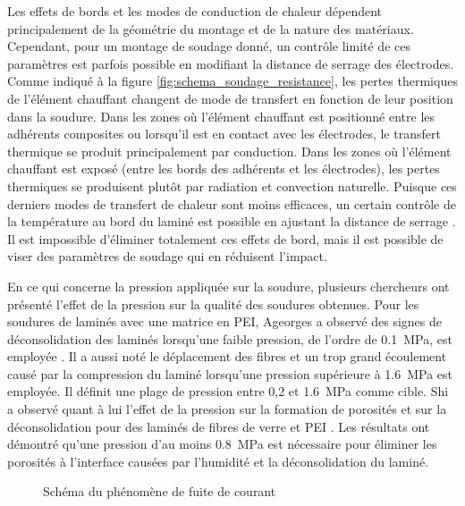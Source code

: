 Les effets de bords et les modes de conduction de chaleur dépendent principalement de la géométrie du montage et de la nature des matériaux. 
Cependant, pour un montage de soudage donné, un contrôle limité de ces paramètres est parfois possible en modifiant la distance de serrage des électrodes. 
Comme indiqué à la figure \ref{fig:schema_soudage_resistance}, les pertes thermiques de l'élément chauffant changent de mode de transfert en fonction de leur position dans la soudure. 
Dans les zones où l'élément chauffant est positionné entre les adhérents composites ou lorsqu'il est en contact avec les électrodes, le transfert thermique se produit principalement par conduction. 
Dans les zones où l'élément chauffant est exposé (entre les bords des adhérents et les électrodes), les pertes thermiques se produisent plutôt par radiation et convection naturelle. 
Puisque ces derniers modes de transfert de chaleur sont moins efficaces, un certain contrôle de la température au bord du laminé est possible en ajustant la distance de serrage \cite{Talbot2013}. 
Il est impossible d'éliminer totalement ces effets de bord, mais il est possible de viser des paramètres de soudage qui en réduisent l'impact. 

En ce qui concerne la pression appliquée sur la soudure, plusieurs chercheurs ont présenté l'effet de la pression sur la qualité des soudures obtenues. 
Pour les soudures de laminés avec une matrice en PEI, Ageorges a observé des signes de déconsolidation des laminés lorsqu'une faible pression, de l'ordre de \SI[locale=FR]{0.1}{\mega\pascal}, est employée \cite{Ageorges2000a}.
Il a aussi noté le déplacement des fibres et un trop grand écoulement causé par la compression du laminé lorsqu'une pression supérieure à \SI[locale=FR]{1.6}{\mega\pascal} est employée. 
Il définit une plage de pression entre 0,2 et \SI[locale=FR]{1.6}{\mega\pascal} comme cible. 
Shi a observé quant à lui l'effet de la pression sur la formation de porosités et sur la déconsolidation pour des laminés de fibres de verre et PEI \cite{Shi2017}. 
Les résultats ont démontré qu'une pression d'au moins \SI[locale=FR]{0.8}{\mega\pascal} est nécessaire pour éliminer les porosités à l'interface causées par l'humidité et la déconsolidation du laminé. 

\begin{figure}[h]
	\centering
	
	\caption{Schéma du phénomène de fuite de courant}
	\label{fig:schema_fuite_de_courant}
\end{figure}

